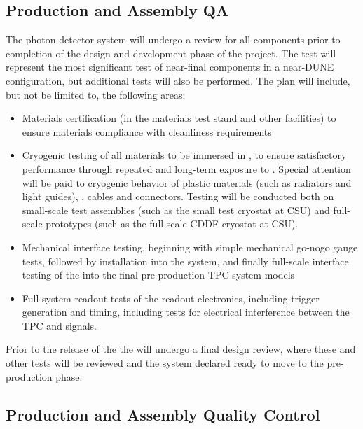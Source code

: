 \subsection{Production and Assembly QA}
\label{sec:fdsp-pd-prodqa}

The photon detector system will undergo a  review for all components prior to completion of the design and development phase of the project.  The  test will represent the most significant test of near-final  components in a near-DUNE configuration, but additional tests will also be performed.  The  plan will include, but not be limited to, the following areas:

\begin{itemize}
\item Materials certification (in the  materials test stand and other facilities) to ensure materials compliance with cleanliness requirements
\item Cryogenic testing of all materials to be immersed in \lar, to ensure satisfactory performance through repeated and long-term exposure to \lar.  Special attention will be paid to cryogenic behavior of plastic materials (such as radiators and light guides), , cables and connectors.  Testing will be conducted both on small-scale test assemblies (such as the small test cryostat at CSU) and full-scale prototypes (such as the full-scale CDDF cryostat at CSU). 
\item Mechanical interface testing, beginning with simple mechanical go-nogo gauge tests, followed by installation into the  system, and finally full-scale interface testing of the  into the final pre-production TPC system models
\item Full-system readout tests of the  readout electronics, including trigger generation and timing, including tests for electrical interference between the TPC and  signals.
\end{itemize}

Prior to the release of the  the  will undergo a final design review, where these and other  tests will be reviewed and the system declared ready to move to the pre-production phase.


\subsection{Production and Assembly Quality Control}
\label{sec:fdsp-pd-prodqc}


